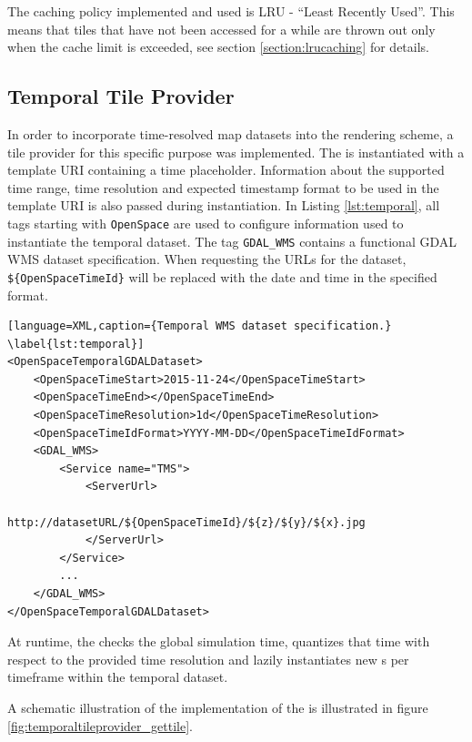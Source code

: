 The caching policy implemented and used is LRU - ``Least Recently Used''. This means that tiles that have not been accessed for a while are thrown out only when the cache limit is exceeded, see section \ref{section:lrucaching} for details.

\subsection{Temporal Tile Provider}
In order to incorporate time-resolved map datasets into the rendering scheme, a tile provider for this specific purpose was implemented. The  is instantiated with a template URI containing a time placeholder. Information about the supported time range, time resolution and expected timestamp format to be used in the template URI is also passed during instantiation. In Listing \ref{lst:temporal}, all tags starting with \texttt{OpenSpace} are used to configure information used to instantiate the temporal dataset. The tag \texttt{GDAL\_WMS} contains a functional GDAL WMS dataset specification. When requesting the URLs for the dataset, \texttt{\$\{OpenSpaceTimeId\}} will be replaced with the date and time in the specified format.

\begin{lstlisting}[language=XML,caption={Temporal WMS dataset specification.} \label{lst:temporal}]
<OpenSpaceTemporalGDALDataset>
    <OpenSpaceTimeStart>2015-11-24</OpenSpaceTimeStart>
    <OpenSpaceTimeEnd></OpenSpaceTimeEnd>
    <OpenSpaceTimeResolution>1d</OpenSpaceTimeResolution>
    <OpenSpaceTimeIdFormat>YYYY-MM-DD</OpenSpaceTimeIdFormat>
    <GDAL_WMS>
        <Service name="TMS">
            <ServerUrl>
                http://datasetURL/${OpenSpaceTimeId}/${z}/${y}/${x}.jpg 
            </ServerUrl>
        </Service>
        ...
    </GDAL_WMS>
</OpenSpaceTemporalGDALDataset>
\end{lstlisting}

At runtime, the  checks the global simulation time, quantizes that time with respect to the provided time resolution and lazily instantiates new s per timeframe within the temporal dataset. 

A schematic illustration of the implementation of the  is illustrated in figure \ref{fig:temporaltileprovider_gettile}.

